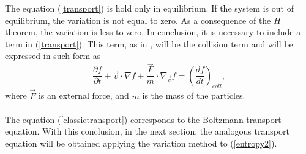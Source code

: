 \documentclass{article}
\begin{document}
The equation (\ref{transport}) is hold only in equilibrium. If the system is out of equilibrium, the variation is not equal to zero. As a consequence of the $H$ theorem, the variation is less to zero. In conclusion, it is necessary to include a term in (\ref{transport}). This term, as in \cite{huang}, will be the collision term and will be expressed in such form as
\begin{equation}
    \frac{\partial f}{\partial t}+\vec{v}\cdot \nabla f+\frac{\vec{F}}{m}\cdot \nabla_{\vec{v}} f=\left( \frac{df}{dt} \right)_{coll}, \label{classictransport}
\end{equation}
where $\vec{F}$ is an external force, and $m$ is the mass of the particles.\\
\\
The equation (\ref{classictransport}) corresponds to the Boltzmann transport equation. With this conclusion, in the next section, the analogous transport equation will be obtained applying the variation method to (\ref{entropy2}).
\end{document}
